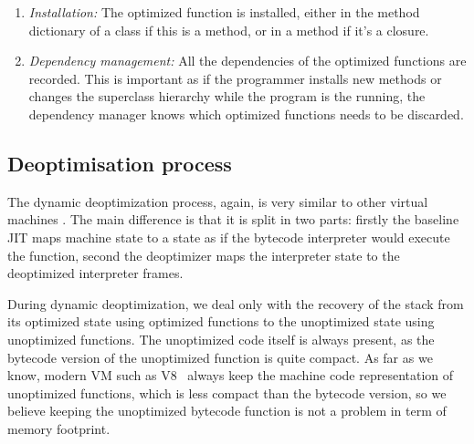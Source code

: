 \documentclass[a4paper,12pt,twoside]{../includes/ThesisStyle}
\begin{document}
\begin{enumerate}
\item \emph{Installation:} The optimized function is installed, either in the method dictionary of a class if this is a method, or in a method if it's a closure.
\item \emph{Dependency management:} All the dependencies of the optimized functions are recorded. This is important as if the programmer installs new methods or changes the superclass hierarchy while the program is the running, the dependency manager knows which optimized functions needs to be discarded.
\end{enumerate}

\subsection {Deoptimisation process}

The dynamic deoptimization process, again, is very similar to other virtual machines \cite{Fin03a, Holz92a}. The main difference is that it is split in two parts: firstly the baseline JIT maps  machine state to a state as if the bytecode interpreter would execute the function, second the deoptimizer maps the interpreter state to the deoptimized interpreter frames.

During dynamic deoptimization, we deal only with the recovery of the stack from its optimized state using optimized functions to the  unoptimized state using unoptimized functions. The unoptimized code itself is always present, as the bytecode version of the  unoptimized function is quite compact. As far as we know, modern VM such as V8~\cite{V8} always keep the machine code representation of unoptimized functions, which is less compact than the bytecode version, so we believe keeping the unoptimized bytecode function is not a problem in term of memory footprint.
\end{document}
